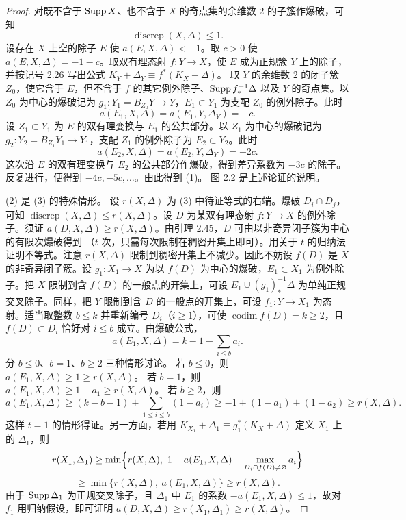 \begin{proof}
对既不含于 $\operatorname{Supp} X$、也不含于 $X$ 的奇点集的余维数 $2$ 的子簇作爆破，可知
\[
\operatorname{discrep}(X,\Delta)\le1.
\]
设存在 $X$ 上空的除子 $E$ 使 $a(E,X,\Delta)<-1$。取 $c>0$ 使 $a(E,X,\Delta)=-1-c$。取双有理态射 $f\colon Y\to X$，使 $E$ 成为正规簇 $Y$ 上的除子，并按记号 2.26 写出公式 $K_Y+\Delta_Y\equiv f^*(K_X+\Delta)$。
取 $Y$ 的余维数 $2$ 的闭子簇 $Z_0$，使它含于 $E$，但不含于 $f$ 的其它例外除子、$\operatorname{Supp} f_*^{-1}\Delta$ 以及 $Y$ 的奇点集。以 $Z_0$ 为中心的爆破记为 $g_1\colon Y_1=B_{Z_0}Y\to Y$，$E_1\subset Y_1$ 为支配 $Z_0$ 的例外除子。此时
\[
a(E_1,X,\Delta)=a(E_1,Y,\Delta_Y)=-c.
\]
设 $Z_1\subset Y_1$ 为 $E$ 的双有理变换与 $E_1$ 的公共部分。以 $Z_1$ 为中心的爆破记为 $g_2\colon Y_2=B_{Z_1}Y_1\to Y_1$，支配 $Z_1$ 的例外除子为 $E_2\subset Y_2$。此时
\[
a(E_2,X,\Delta)=a(E_2,Y,\Delta_Y)=-2c.
\]
这次沿 $E$ 的双有理变换与 $E_2$ 的公共部分作爆破，得到差异系数为 $-3c$ 的除子。反复进行，便得到 $-4c,-5c,\dots$。由此得到 (1)。
图 2.2 是上述论证的说明。
\begin{figure}[htbp]
\centering
\resizebox{0.72\textwidth}{!}{}
\end{figure}
(2) 是 (3) 的特殊情形。
设 $r(X,\Delta)$ 为 (3) 中待证等式的右端。爆破 $D_i\cap D_j$，可知 $\operatorname{discrep}(X,\Delta)\le r(X,\Delta)$。设 $D$ 为某双有理态射 $f\colon Y\to X$ 的例外除子。须证 $a(D,X,\Delta)\ge r(X,\Delta)$。由引理 2.45，$D$ 可由以非奇异闭子簇为中心的有限次爆破得到
（$t$ 次，只需每次限制在稠密开集上即可）。用关于 $t$ 的归纳法证明不等式。注意 $r(X,\Delta)$ 限制到稠密开集上不减少。因此不妨设 $f(D)$ 是 $X$ 的非奇异闭子簇。设 $g_1\colon X_1\to X$ 为以 $f(D)$ 为中心的爆破，$E_1\subset X_1$ 为例外除子。把 $X$ 限制到含 $f(D)$ 的一般点的开集上，可设 $E_1\cup(g_1)_*^{-1}\Delta$ 为单纯正规交叉除子。同样，把 $Y$ 限制到含 $D$ 的一般点的开集上，可设 $f_1\colon Y\to X_1$ 为态射。适当取整数 $b\le k$ 并重新编号 $D_i$（$i\ge1$），可使 $\operatorname{codim}f(D)=k\ge2$，且 $f(D)\subset D_i$ 恰好对 $i\le b$ 成立。由爆破公式，
\[
a(E_1,X,\Delta)=k-1-\sum_{i\le b}a_i.
\]
分 $b\le0$、$b=1$、$b\ge2$ 三种情形讨论。
若 $b\le0$，则 $a(E_1,X,\Delta)\ge1\ge r(X,\Delta)$。
若 $b=1$，则 $a(E_1,X,\Delta)\ge1-a_1\ge r(X,\Delta)$。
若 $b\ge2$，则
\[
a(E_1,X,\Delta)\ge(k-b-1)+\sum_{1\le i\le b}(1-a_i)\ge-1+(1-a_1)+(1-a_2)\ge r(X,\Delta).
\]
这样 $t=1$ 的情形得证。另一方面，若用 $K_{X_1}+\Delta_1\equiv g_1^*(K_X+\Delta)$ 定义 $X_1$ 上的 $\Delta_1$，则
\[
r(X_1,\Delta_1)\ge\min\Bigl\{r(X,\Delta),\ 1+a(E_1,X,\Delta)-\max_{D_i\cap f(D)\ne\varnothing}a_i\Bigr\}
\]
\[
\ge\min\{r(X,\Delta),\ a(E_1,X,\Delta)\}\ge r(X,\Delta).
\]
由于 $\operatorname{Supp}\Delta_1$ 为正规交叉除子，且 $\Delta_1$ 中 $E_1$ 的系数 $-a(E_1,X,\Delta)\le1$，故对 $f_1$ 用归纳假设，即可证明 $a(D,X,\Delta)\ge r(X_1,\Delta_1)\ge r(X,\Delta)$。
\end{proof}

